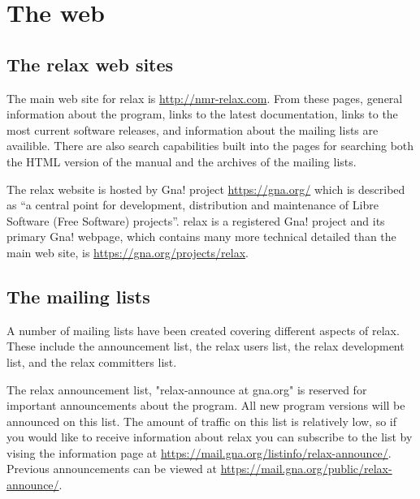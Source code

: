 
\chapter{The web}




\section{The relax web sites}

The main web site for relax is \href{http://nmr-relax.com}{http://nmr-relax.com}.  From these pages, general information about the program, links to the latest documentation, links to the most current software releases, and information about the mailing lists are availible.  There are also search capabilities built into the pages for searching both the HTML version of the manual and the archives of the mailing lists.

The relax website is hosted by Gna! project \href{https://gna.org/}{https://gna.org/} which is described as ``a central point for development, distribution and maintenance of Libre Software (Free Software) projects''.  relax is a registered Gna! project and its primary Gna! webpage, which contains many more technical detailed than the main web site, is \href{https://gna.org/projects/relax}{https://gna.org/projects/relax}.




\section{The mailing lists}

A number of mailing lists have been created covering different aspects of relax.  These include the announcement list, the relax users list, the relax development list, and the relax committers list.

The relax announcement list, "relax-announce at gna.org" is reserved for important announcements about the program.  All new program versions will be announced on this list.  The amount of traffic on this list is relatively low, so if you would like to receive information about relax you can subscribe to the list by vising the information page at \href{https://mail.gna.org/listinfo/relax-announce/}{https://mail.gna.org/listinfo/relax-announce/}.  Previous announcements can be viewed at \href{https://mail.gna.org/public/relax-announce/}{https://mail.gna.org/public/relax-announce/}.

